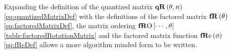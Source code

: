 \newcommand{\round}[1]{\text{Round}\left[ #1 \right] }
\newcommand{\elemU}{\mathbf{U}}
\newcommand{\elemAp}{\mathbf{A}_\oplus}
\newcommand{\elemAm}{\mathbf{A}_\circleddash }
\newcommand{\elemBp}{\mathbf{B}_\oplus}
\newcommand{\elemBm}{\mathbf{B}_\circleddash }
Expanding the definition of the quantized matrix $\qR[\theta, n]$ \ref{eq:quantizedMatrixDef} with the definitions of the factored matrix $\fR[\theta] $ \ref{eq:factoredMatrixDef}, the matrix ordering $ \fRO \left[ \cdots , \theta \right] $ \ref{table:factoredRotationMatrix} and the factored matrix function $\fRe[\phi]$ \ref{eq:fReDef} allows a more algorithm minded form to be written.
%

